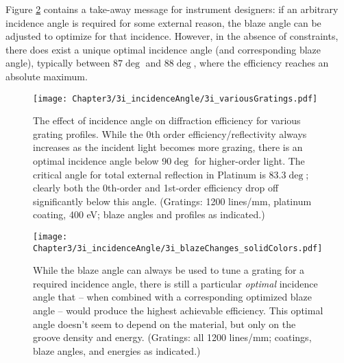 Figure \ref{3i-2} contains a take-away message for instrument designers: if an arbitrary incidence angle is required for some external reason, the blaze angle can be adjusted to optimize for that incidence. However, in the absence of constraints, there does exist a unique optimal incidence angle (and corresponding blaze angle), typically between $87\deg$ and $88\deg$, where the efficiency reaches an absolute maximum.


\begin{figure}[htbp] %
   \centering
   \texttt{[image: Chapter3/3i\_incidenceAngle/3i\_variousGratings.pdf]} 
   \caption[The effect of incidence angle on diffraction efficiency for various grating profiles.  While the 0th order efficiency/reflectivity always increases as the incident light becomes more grazing, there is an optimal incidence angle below 90$\deg$ for higher-order light.]{The effect of incidence angle on diffraction efficiency for various grating profiles.  While the 0th order efficiency/reflectivity always increases as the incident light becomes more grazing, there is an optimal incidence angle below 90$\deg$ for higher-order light.  The critical angle for total external reflection in Platinum is 83.3$\deg$; clearly both the 0th-order and 1st-order efficiency drop off significantly below this angle. (Gratings: 1200 lines/mm, platinum coating, 400 eV; blaze angles and profiles as indicated.)}
   \label{3i}
\end{figure}
	
\begin{figure}[htbp] %
   \centering
   \texttt{[image: Chapter3/3i\_incidenceAngle/3i\_blazeChanges\_solidColors.pdf]} 
   \caption[While the blaze angle can always be used to tune a grating for a required incidence angle, there is still a particular \emph{optimal} incidence angle that -- when combined with a corresponding optimized blaze angle -- would produce the highest achievable efficiency.]{While the blaze angle can always be used to tune a grating for a required incidence angle, there is still a particular \emph{optimal} incidence angle that -- when combined with a corresponding optimized blaze angle -- would produce the highest achievable efficiency.  This optimal angle doesn't seem to depend on the material, but only on the groove density and energy.  (Gratings: all 1200 lines/mm; coatings, blaze angles, and energies as indicated.)}
   \label{3i-2}
\end{figure}

